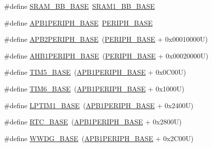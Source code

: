 \begin{DoxyCompactItemize}
\#define \hyperlink{group___peripheral__registers__structures_gad3548b6e2f017f39d399358f3ac98454}{S\+R\+A\+M\+\_\+\+B\+B\+\_\+\+B\+A\+SE}~\hyperlink{group___peripheral__memory__map_gac4c4f61082e4b168f29d9cf97dc3ca5c}{S\+R\+A\+M1\+\_\+\+B\+B\+\_\+\+B\+A\+SE}
\item 
\#define \hyperlink{group___peripheral__registers__structures_ga45666d911f39addd4c8c0a0ac3388cfb}{A\+P\+B1\+P\+E\+R\+I\+P\+H\+\_\+\+B\+A\+SE}~\hyperlink{group___peripheral__memory__map_ga9171f49478fa86d932f89e78e73b88b0}{P\+E\+R\+I\+P\+H\+\_\+\+B\+A\+SE}
\item 
\#define \hyperlink{group___peripheral__registers__structures_ga25b99d6065f1c8f751e78f43ade652cb}{A\+P\+B2\+P\+E\+R\+I\+P\+H\+\_\+\+B\+A\+SE}~(\hyperlink{group___peripheral__memory__map_ga9171f49478fa86d932f89e78e73b88b0}{P\+E\+R\+I\+P\+H\+\_\+\+B\+A\+SE} + 0x00010000\+U)
\item 
\#define \hyperlink{group___peripheral__registers__structures_ga811a9a4ca17f0a50354a9169541d56c4}{A\+H\+B1\+P\+E\+R\+I\+P\+H\+\_\+\+B\+A\+SE}~(\hyperlink{group___peripheral__memory__map_ga9171f49478fa86d932f89e78e73b88b0}{P\+E\+R\+I\+P\+H\+\_\+\+B\+A\+SE} + 0x00020000\+U)
\item 
\#define \hyperlink{group___peripheral__registers__structures_ga3e1671477190d065ba7c944558336d7e}{T\+I\+M5\+\_\+\+B\+A\+SE}~(\hyperlink{group___peripheral__memory__map_ga45666d911f39addd4c8c0a0ac3388cfb}{A\+P\+B1\+P\+E\+R\+I\+P\+H\+\_\+\+B\+A\+SE} + 0x0\+C00\+U)
\item 
\#define \hyperlink{group___peripheral__registers__structures_ga8268ec947929f192559f28c6bf7d1eac}{T\+I\+M6\+\_\+\+B\+A\+SE}~(\hyperlink{group___peripheral__memory__map_ga45666d911f39addd4c8c0a0ac3388cfb}{A\+P\+B1\+P\+E\+R\+I\+P\+H\+\_\+\+B\+A\+SE} + 0x1000\+U)
\item 
\#define \hyperlink{group___peripheral__registers__structures_ga012ceb003fbb615eedb39a8d7f31c9c6}{L\+P\+T\+I\+M1\+\_\+\+B\+A\+SE}~(\hyperlink{group___peripheral__memory__map_ga45666d911f39addd4c8c0a0ac3388cfb}{A\+P\+B1\+P\+E\+R\+I\+P\+H\+\_\+\+B\+A\+SE} + 0x2400\+U)
\item 
\#define \hyperlink{group___peripheral__registers__structures_ga4265e665d56225412e57a61d87417022}{R\+T\+C\+\_\+\+B\+A\+SE}~(\hyperlink{group___peripheral__memory__map_ga45666d911f39addd4c8c0a0ac3388cfb}{A\+P\+B1\+P\+E\+R\+I\+P\+H\+\_\+\+B\+A\+SE} + 0x2800\+U)
\item 
\#define \hyperlink{group___peripheral__registers__structures_ga9a5bf4728ab93dea5b569f5b972cbe62}{W\+W\+D\+G\+\_\+\+B\+A\+SE}~(\hyperlink{group___peripheral__memory__map_ga45666d911f39addd4c8c0a0ac3388cfb}{A\+P\+B1\+P\+E\+R\+I\+P\+H\+\_\+\+B\+A\+SE} + 0x2\+C00\+U)

\end{DoxyCompactItemize}
